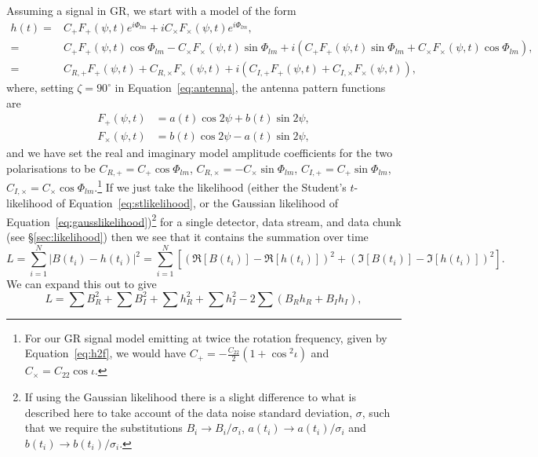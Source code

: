 Assuming a signal in GR, we start with a model of the form
\begin{align}\label{eq:appmodel}
h(t) =& C_+ F_+(\psi,t)e^{i\Phi_{lm}} + iC_{\times}F_{\times}(\psi,t)e^{i\Phi_{lm}}, \nonumber \\
=& C_+ F_+(\psi,t)\cos{\Phi_{lm}} - C_{\times}F_{\times}(\psi,t)\sin{\Phi_{lm}} + i\left(C_+ F_+(\psi,t)\sin{\Phi_{lm}}+ C_{\times}F_{\times}(\psi,t)\cos{\Phi_{lm}} \right), \nonumber \\
=& C_{R,+}F_+(\psi,t) + C_{R,\times}F_{\times}(\psi,t) + i\left(C_{I,+}F_+(\psi,t) + C_{I,\times}F_{\times}(\psi,t) \right),
\end{align}
where, setting $\zeta = 90^{\circ}$ in Equation~\ref{eq:antenna}, the antenna pattern functions are
\begin{align}\label{eq:antennanew}
F_+(\psi,t) &=a(t)\cos{2\psi} + b(t)\sin{2\psi}, \nonumber \\
F_{\times}(\psi,t) &= b(t)\cos{2\psi} - a(t)\sin{2\psi},
\end{align}
and we have set the real and imaginary model amplitude coefficients for the two polarisations to be $C_{R,+} =
C_+\cos{\Phi_{lm}}$, $C_{R,\times} = -C_{\times}\sin{\Phi_{lm}}$, $C_{I,+} =
C_+\sin{\Phi_{lm}}$, $C_{I,\times} = C_{\times}\cos{\Phi_{lm}}$.\footnote{For our GR signal model emitting at twice
the rotation frequency, given by Equation~\ref{eq:h2f}, we would have $C_+ = -\frac{C_{22}}{2}\left(1+\cos{}^2{\iota}\right)$ and $C_{\times} = C_{22}\cos{\iota}$.}
If we just take the likelihood (either the Student's $t$-likelihood of Equation~\ref{eq:stlikelihood}, or the
Gaussian likelihood of Equation~\ref{eq:gausslikelihood})\footnote{If using the Gaussian likelihood there is a slight difference to what is 
described here to take account of the data noise standard deviation, $\sigma$, 
such that we require the substitutions $B_i \rightarrow B_i/\sigma_i$, $a(t_i) \rightarrow a(t_i)/\sigma_i$ and $b(t_i) \rightarrow b(t_i)/\sigma_i$.} for a single detector,
data stream, and data chunk (see \S\ref{sec:likelihood}) then we see that it contains the summation over time
\begin{equation}
L = \sum_{i=1}^N \left|B(t_i) - h(t_i)\right|^2 = \sum_{i=1}^N \left[ \left(\Re{[B(t_i)]} - \Re{[h(t_i)]}\right)^2 + \left(\Im{[B(t_i)]} - \Im{[h(t_i)]}\right)^2 \right].
\end{equation}
We can expand this out to give
\begin{equation}\label{eq:likepart}
L = \sum B_R^2 + \sum B_I^2 + \sum h_R^2 + \sum h_I^2 - 2\sum\left(B_R h_R + B_I h_I \right),
\end{equation}
